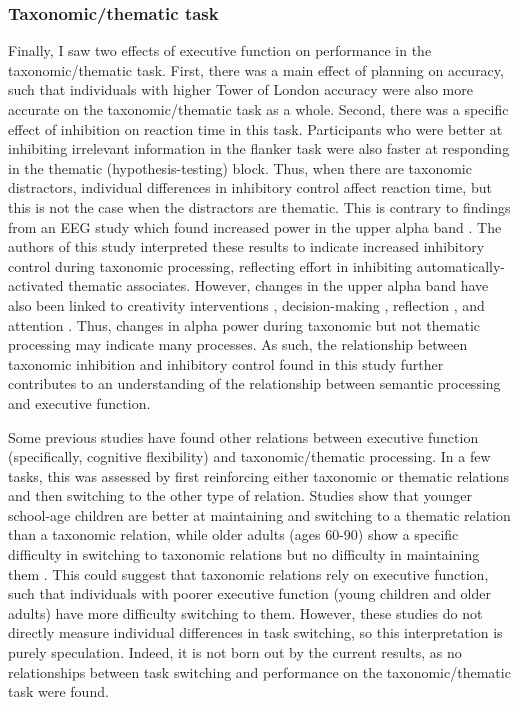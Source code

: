 \documentclass[../dissertation.tex]{subfiles}
\begin{document}
\subsubsection{Taxonomic/thematic task}
	Finally, I saw two effects of executive function on performance in the taxonomic/thematic task. First, there was a main effect of planning on accuracy, such that individuals with higher Tower of London accuracy were also more accurate on the taxonomic/thematic task as a whole. Second, there was a specific effect of inhibition on reaction time in this task. Participants who were better at inhibiting irrelevant information in the flanker task were also faster at responding in the thematic (hypothesis-testing) block. Thus, when there are taxonomic distractors, individual differences in inhibitory control affect reaction time, but this is not the case when the distractors are thematic. This is contrary to findings from an EEG study which found increased power in the upper alpha band \citep{Maguire2010}. The authors of this study interpreted these results to indicate increased inhibitory control during taxonomic processing, reflecting effort in inhibiting automatically-activated thematic associates. However, changes in the upper alpha band have also been linked to creativity interventions \citep{Fink2011}, decision-making \citep{Fink2018}, reflection \citep{Rominger2017}, and attention \citep{VanderLubbe2019}. Thus, changes in alpha power during taxonomic but not thematic processing may indicate many processes. As such, the relationship between taxonomic inhibition and inhibitory control found in this study further contributes to an understanding of the relationship between semantic processing and executive function. \par
	Some previous studies have found other relations between executive function (specifically, cognitive flexibility) and taxonomic/thematic processing. In a few tasks, this was assessed by first reinforcing either taxonomic or thematic relations and then switching to the other type of relation. Studies show that younger school-age children are better at maintaining and switching to a thematic relation than a taxonomic relation, while older adults (ages 60-90) show a specific difficulty in switching to taxonomic relations but no difficulty in maintaining them \citep{Blaye2007, Maintenant2011}. This could suggest that taxonomic relations rely on executive function, such that individuals with poorer executive function (young children and older adults) have more difficulty switching to them. However, these studies do not directly measure individual differences in task switching, so this interpretation is purely speculation. Indeed, it is not born out by the current results, as no relationships between task switching and performance on the taxonomic/thematic task were found. \par 
\end{document}
